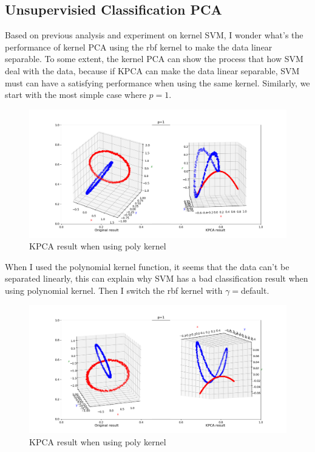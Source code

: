 \documentclass{article}
\begin{document}
\subsection{Unsupervisied Classification PCA}
Based on previous analysis and experiment on kernel SVM, I wonder what's the performance of kernel PCA using the rbf kernel to make the data linear separable. To some extent, the kernel PCA can show the process that how SVM deal with the data, because if KPCA can make the data linear separable, SVM must can have a satisfying performance when using the same kernel. Similarly, we start with the most simple case where $p=1$.
\begin{figure}[H]
    \centering
    \includegraphics[scale=0.4]{PCA1.png}
    \caption{KPCA result when using poly kernel}
    \label{PCA1}
\end{figure}
When I used the polynomial kernel function, it seems that the data can't be separated linearly, this can explain why SVM has a bad classification result when using polynomial kernel. Then I switch the rbf kernel with $\gamma=$default.
\begin{figure}[H]
    \centering
    \includegraphics[scale=0.4]{PCA3.png}
    \caption{KPCA result when using poly kernel}
    \label{PCA3}
\end{figure}
\end{document}
